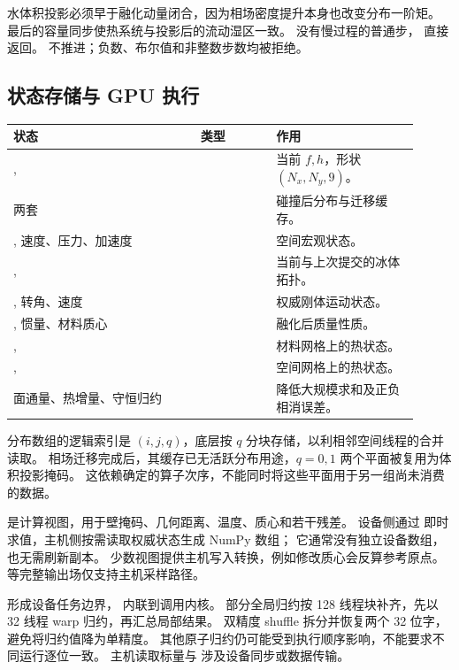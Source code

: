 水体积投影必须早于融化动量闭合，因为相场密度提升本身也改变分布一阶矩。
最后的容量同步使热系统与投影后的流动湿区一致。
没有慢过程的普通步， 直接返回。
 不推进；负数、布尔值和非整数步数均被拒绝。

\subsection{状态存储与 GPU 执行}
\begin{longtable}{L{0.42\linewidth}L{0.17\linewidth}L{0.32\linewidth}}
\toprule 状态 & 类型 & 作用\\\midrule
\endhead
{},  &  & 当前 $f,h$，形状 $(N_x,N_y,9)$。\\
两套  &  & 碰撞后分布与迁移缓存。\\
, 速度、压力、加速度 &  & 空间宏观状态。\\
,  &  & 当前与上次提交的冰体拓扑。\\
, 转角、速度 &  & 权威刚体运动状态。\\
, 惯量、材料质心 &  & 融化后质量性质。\\
,  &  & 材料网格上的热状态。\\
,  &  & 空间网格上的热状态。\\
面通量、热增量、守恒归约 &  & 降低大规模求和及正负相消误差。\\
\bottomrule
\end{longtable}
分布数组的逻辑索引是 $(i,j,q)$，底层按 $q$ 分块存储，以利相邻空间线程的合并读取。
相场迁移完成后，其缓存已无活跃分布用途，$q=0,1$ 两个平面被复用为体积投影掩码。
这依赖确定的算子次序，不能同时将这些平面用于另一组尚未消费的数据。

 是计算视图，用于壁掩码、几何距离、温度、质心和若干残差。
设备侧通过  即时求值，主机侧按需读取权威状态生成 NumPy 数组；
它通常没有独立设备数组，也无需刷新副本。
少数视图提供主机写入转换，例如修改质心会反算参考原点。
 等完整输出场仅支持主机采样路径。

 形成设备任务边界， 内联到调用内核。
部分全局归约按 128 线程块补齐，先以 32 线程 warp 归约，再汇总局部结果。
双精度 shuffle 拆分并恢复两个 32 位字，避免将归约值降为单精度。
其他原子归约仍可能受到执行顺序影响，不能要求不同运行逐位一致。
主机读取标量与  涉及设备同步或数据传输。


